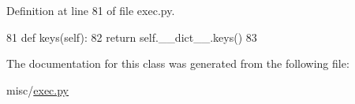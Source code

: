 Definition at line 81 of file exec.\+py.


\begin{DoxyCode}
81   \textcolor{keyword}{def }keys(self):
82     \textcolor{keywordflow}{return} self.\_\_dict\_\_.keys()
83 
\end{DoxyCode}


The documentation for this class was generated from the following file\+:\begin{DoxyCompactItemize}
\item 
misc/\hyperlink{exec_8py}{exec.\+py}\end{DoxyCompactItemize}
